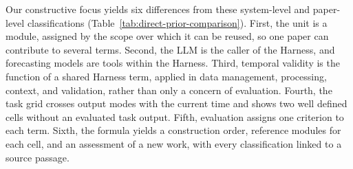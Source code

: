\documentclass[preprints,article,submit,moreauthors]{Definitions/mdpi}
\begin{document}
Our constructive focus yields six differences from these system-level and paper-level classifications (Table~\ref{tab:direct-prior-comparison}). First, the unit is a module, assigned by the scope over which it can be reused, so one paper can contribute to several terms. Second, the LLM is the caller of the Harness, and forecasting models are tools within the Harness. Third, temporal validity is the function of a shared Harness term, applied in data management, processing, context, and validation, rather than only a concern of evaluation. Fourth, the task grid crosses output modes with the current time and shows two well defined cells without an evaluated task output. Fifth, evaluation assigns one criterion to each term. Sixth, the formula yields a construction order, reference modules for each cell, and an assessment of a new work, with every classification linked to a source passage.
\end{document}
